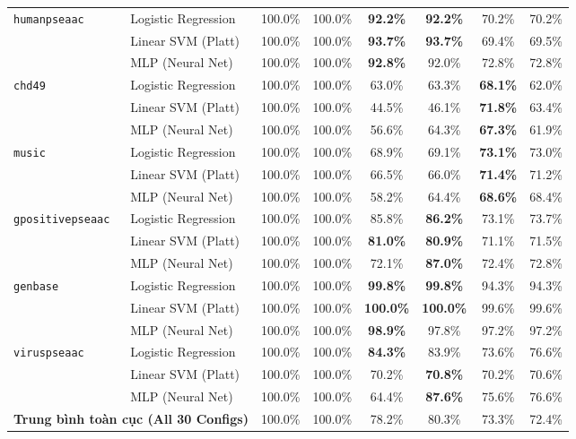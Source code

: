 \documentclass[10pt,a4paper,twoside]{article}
\begin{document}
\begin{table}[H]
{\begin{tabular}{llcccccc}
\midrule
\multirow{3}{*}{\texttt{humanpseaac}} & Logistic Regression & 100.0\% & 100.0\% & \textbf{92.2\%} & \textbf{92.2\%} & 70.2\% & 70.2\% \\
 & Linear SVM (Platt) & 100.0\% & 100.0\% & \textbf{93.7\%} & \textbf{93.7\%} & 69.4\% & 69.5\% \\
 & MLP (Neural Net) & 100.0\% & 100.0\% & \textbf{92.8\%} & 92.0\% & 72.8\% & 72.8\% \\
\midrule
\multirow{3}{*}{\texttt{chd49}} & Logistic Regression & 100.0\% & 100.0\% & 63.0\% & 63.3\% & \textbf{68.1\%} & 62.0\% \\
 & Linear SVM (Platt) & 100.0\% & 100.0\% & 44.5\% & 46.1\% & \textbf{71.8\%} & 63.4\% \\
 & MLP (Neural Net) & 100.0\% & 100.0\% & 56.6\% & 64.3\% & \textbf{67.3\%} & 61.9\% \\
\midrule
\multirow{3}{*}{\texttt{music}} & Logistic Regression & 100.0\% & 100.0\% & 68.9\% & 69.1\% & \textbf{73.1\%} & 73.0\% \\
 & Linear SVM (Platt) & 100.0\% & 100.0\% & 66.5\% & 66.0\% & \textbf{71.4\%} & 71.2\% \\
 & MLP (Neural Net) & 100.0\% & 100.0\% & 58.2\% & 64.4\% & \textbf{68.6\%} & 68.4\% \\
\midrule
\multirow{3}{*}{\texttt{gpositivepseaac}} & Logistic Regression & 100.0\% & 100.0\% & 85.8\% & \textbf{86.2\%} & 73.1\% & 73.7\% \\
 & Linear SVM (Platt) & 100.0\% & 100.0\% & \textbf{81.0\%} & \textbf{80.9\%} & 71.1\% & 71.5\% \\
 & MLP (Neural Net) & 100.0\% & 100.0\% & 72.1\% & \textbf{87.0\%} & 72.4\% & 72.8\% \\
\midrule
\multirow{3}{*}{\texttt{genbase}} & Logistic Regression & 100.0\% & 100.0\% & \textbf{99.8\%} & \textbf{99.8\%} & 94.3\% & 94.3\% \\
 & Linear SVM (Platt) & 100.0\% & 100.0\% & \textbf{100.0\%} & \textbf{100.0\%} & 99.6\% & 99.6\% \\
 & MLP (Neural Net) & 100.0\% & 100.0\% & \textbf{98.9\%} & 97.8\% & 97.2\% & 97.2\% \\
\midrule
\multirow{3}{*}{\texttt{viruspseaac}} & Logistic Regression & 100.0\% & 100.0\% & \textbf{84.3\%} & 83.9\% & 73.6\% & 76.6\% \\
 & Linear SVM (Platt) & 100.0\% & 100.0\% & 70.2\% & \textbf{70.8\%} & 70.2\% & 70.6\% \\
 & MLP (Neural Net) & 100.0\% & 100.0\% & 64.4\% & \textbf{87.6\%} & 75.6\% & 76.6\% \\
\midrule
\multicolumn{2}{l}{\textbf{Trung bình toàn cục (All 30 Configs)}} & 100.0\% & 100.0\% & 78.2\% & 80.3\% & 73.3\% & 72.4\% \\
\bottomrule
\end{tabular}%
}
\end{table}
\end{document}
